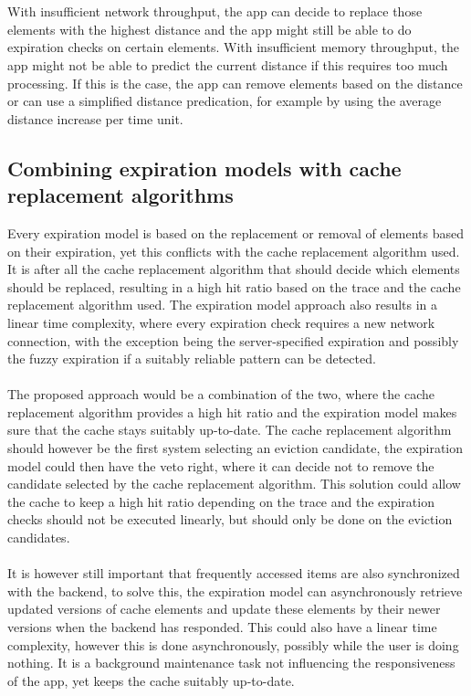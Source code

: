 \documentclass[pdftex,a4paper,12pt,twoside]{report}
\begin{document}
\\\\
With insufficient network throughput, the app can decide to replace those elements with the highest distance and the app might still be able to do expiration checks on certain elements. With insufficient memory throughput, the app might not be able to predict the current distance if this requires too much processing. If this is the case, the app can remove elements based on the distance or can use a simplified distance predication, for example by using the average distance increase per time unit.
\subsection{Combining expiration models with cache replacement algorithms}
Every expiration model is based on the replacement or removal of elements based on their expiration, yet this conflicts with the cache replacement algorithm used. It is after all the cache replacement algorithm that should decide which elements should be replaced, resulting in a high hit ratio based on the trace and the cache replacement algorithm used. The expiration model approach also results in a linear time complexity, where every expiration check requires a new network connection, with the exception being the server-specified expiration and possibly the fuzzy expiration if a suitably reliable pattern can be detected.
\\\\
The proposed approach would be a combination of the two, where the cache replacement algorithm provides a high hit ratio and the expiration model makes sure that the cache stays suitably up-to-date. The cache replacement algorithm should however be the first system selecting an eviction candidate, the expiration model could then have the veto right, where it can decide not to remove the candidate selected by the cache replacement algorithm. This solution could allow the cache to keep a high hit ratio depending on the trace and the expiration checks should not be executed linearly, but should only be done on the eviction candidates.
\\\\
It is however still important that frequently accessed items are also synchronized with the backend, to solve this, the expiration model can asynchronously retrieve updated versions of cache elements and update these elements by their newer versions when the backend has responded. This could also have a linear time complexity, however this is done asynchronously, possibly while the user is doing nothing. It is a background maintenance task not influencing the responsiveness of the app, yet keeps the cache suitably up-to-date.
\end{document}
